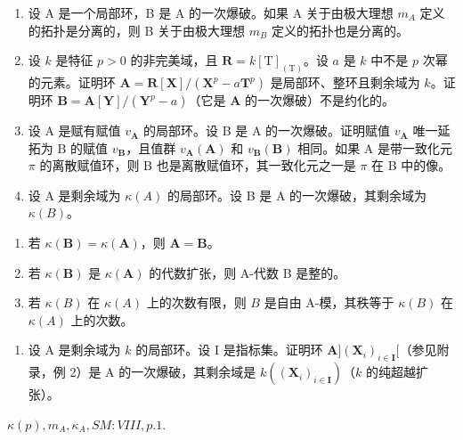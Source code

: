 \begin{enumerate}
\def\labelenumi{\arabic{enumi})}
\setcounter{enumi}{1}
\item
  设 A 是一个局部环，B 是 A 的一次爆破。如果 A 关于由极大理想 \(m_{A}\) 定义的拓扑是分离的，则 B 关于由极大理想 \(m_{B}\) 定义的拓扑也是分离的。
\item
  设 \(k\) 是特征 \(p > 0\) 的非完美域，且 \(\mathbf{R} = k[\mathrm{T}]_{(\mathrm{T})}\)。设 \(a\) 是 \(k\) 中不是 \(p\) 次幂的元素。证明环 \(\mathbf{A} = \mathbf{R}[\mathbf{X}] / (\mathbf{X}^p - a\mathbf{T}^p)\) 是局部环、整环且剩余域为 \(k\)。证明环 \(\mathbf{B} = \mathbf{A}[\mathbf{Y}] / (\mathbf{Y}^p - a)\)（它是 \(\mathbf{A}\) 的一次爆破）不是约化的。
\item
  设 A 是赋有赋值 \(v_{\mathbf{A}}\) 的局部环。设 B 是 A 的一次爆破。证明赋值 \(v_{\mathbf{A}}\) 唯一延拓为 B 的赋值 \(v_{\mathbf{B}}\)，且值群 \(v_{\mathbf{A}}(\mathbf{A})\) 和 \(v_{\mathbf{B}}(\mathbf{B})\) 相同。如果 A 是带一致化元 \(\pi\) 的离散赋值环，则 B 也是离散赋值环，其一致化元之一是 \(\pi\) 在 B 中的像。
\item
  设 A 是剩余域为 \(\kappa(A)\) 的局部环。设 B 是 A 的一次爆破，其剩余域为 \(\kappa(B)\)。
\end{enumerate}

\begin{enumerate}
\def\labelenumi{\alph{enumi})}
\item
  若 \(\kappa(\mathbf{B}) = \kappa(\mathbf{A})\)，则 \(\mathbf{A} = \mathbf{B}\)。
\item
  若 \(\kappa(\mathbf{B})\) 是 \(\kappa(\mathbf{A})\) 的代数扩张，则 A-代数 B 是整的。
\item
  若 \(\kappa(B)\) 在 \(\kappa(A)\) 上的次数有限，则 \(B\) 是自由 A-模，其秩等于 \(\kappa(B)\) 在 \(\kappa(A)\) 上的次数。
\end{enumerate}

\begin{enumerate}
\def\labelenumi{\arabic{enumi})}
\setcounter{enumi}{5}
\tightlist
\item
  设 A 是剩余域为 \(k\) 的局部环。设 I 是指标集。证明环 \(\mathbf{A}](\mathbf{X}_i)_{i\in \mathbf{I}}[\)（参见附录，例 2）是 A 的一次爆破，其剩余域是 \(k((\mathbf{X}_i)_{i\in \mathbf{I}})\)（\(k\) 的纯超越扩张）。
\end{enumerate}



\(\kappa(p), m_A, \kappa_A, SM: VIII, p. 1.\)

